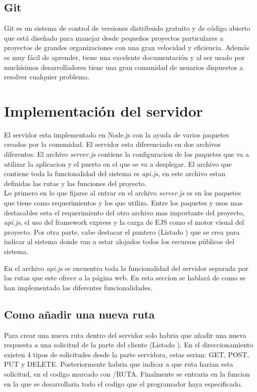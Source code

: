 \subsection{Git}
Git es un sistema de control de versiones distribuido gratuito y de código abierto que está diseñado para manejar desde pequeños proyectos particulares a proyectos de grandes organizaciones con una gran velocidad y eficiencia. Además es muy fácil de aprender, tiene una excelente documentación y al ser usado por muchísimos desarrolladores tiene una gran comunidad de usuarios dispuestos a resolver cualquier problema.

\section{Implementación del servidor}
El servidor esta implementado en Node.js con la ayuda de varios paquetes creados por la comunidad. El servidor esta diferenciado en dos archivos diferentes. El archivo \textit{server.js} contiene la configuracion de los paquetes que va a utilizar la aplicacion y el puerto en el que se va a desplegar. El archivo que contiene toda la funcionalidad del sistema es \textit{api.js}, en este archivo estan definidas las rutas y las funciones del proyecto.\\

Lo primero en lo que fijarse al entrar en el archivo \textit{server.js} es en los paquetes que tiene como requerimientos y los que utiliza. Entre los paquetes y usos mas destacables esta el requerimiento del otro archivo mas importante del proyecto, \textit{api.js}, el uso del framework express y la carga de EJS como el motor visual del proyecto. Por otra parte, cabe destacar el puntero (Listado ) que se crea para indicar al sistema donde van a estar alojados todos los recursos públicos del sistema.\\


En el archivo \textit{api.js} se encuentra toda la funcionalidad del servidor separada por las rutas que este ofrece a la página web. En esta seccion se hablará de como se han implementado las diferentes funcionalidades.

\subsection{Como añadir una nueva ruta}
Para crear una nueva ruta dentro del servidor solo habria que añadir una nueva respuesta a una solicitud de la parte del cliente (Listado ). En el direccionamiento existen 4 tipos de solicitudes desde la parte servidora, estas serian: GET, POST, PUT y DELETE. Posteriormente habria que indicar a que ruta harian esta solicitud, en el codigo marcado con /RUTA. Finalmente se entraria en la funcion en la que se desarrollaria todo el codigo que el programador haya especificado.\\ 

